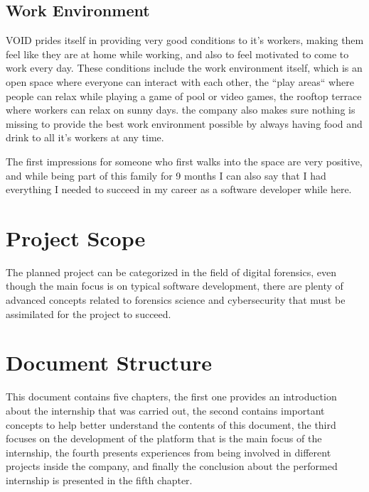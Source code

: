 \subsection{Work Environment}

VOID prides itself in providing very good conditions to it's workers, making them feel like they are at home while working,
and also to feel motivated to come to work every day. These conditions include the work environment itself, which is an open space where 
everyone can interact with each other, the ``play areas`` where people can relax while playing a game of pool or video games, the rooftop terrace where workers can relax on sunny days.
the company also makes sure nothing is missing to provide the best work environment possible by always having food and drink to all it's workers at any time.

The first impressions for someone who first walks into the space are very positive, and while being part of this family for 9 months I can also say that I had everything 
I needed to succeed in my career as a software developer while here.


\section{Project Scope}

The planned project can be categorized in the field of digital forensics, even though the main focus is on typical software development, there are plenty of advanced concepts
related to forensics science and cybersecurity that must be assimilated for the project to succeed.


\section{Document Structure}

This document contains five chapters, the first one provides an introduction about the internship that was carried out, 
the second contains important concepts to help better understand the contents of this document, the third focuses on the development
of the platform that is the main focus of the internship, the fourth presents experiences from being involved in different projects inside the company,
and finally the conclusion about the performed internship is presented in the fifth chapter.
